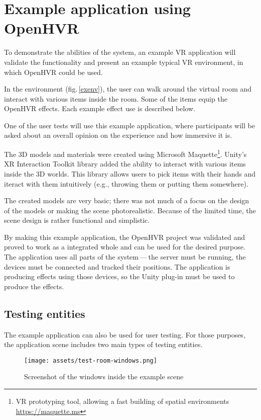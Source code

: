 \chapter{Example application using OpenHVR}\label{exampleapp}

To demonstrate the abilities of the system, an example VR application
will validate the functionality and present an example typical VR
environment, in which OpenHVR could be used.

In the environment (fig.\,\ref{exenv}), the user can walk around the virtual 
room and interact with various items inside the room. Some of the items equip the OpenHVR
effects. Each example effect use is described below.

One of the user tests will use this example application, where
participants will be asked about an overall opinion on the experience and
how immersive it is.

The 3D models and materials were created using Microsoft Maquette\footnote{VR 
prototyping tool, allowing a fast building of spatial 
environments \href{https://maquette.ms}{https://maquette.ms}}.
Unity’s XR Interaction Toolkit library added the ability to
interact with various items inside the 3D worlds. This library allows users to
pick items with their hands and iteract with them intuitively (e.g., throwing them
or putting them somewhere).


The created models are very basic; there was not much of a focus on the design
of the models or making the scene photorealistic. Because of the limited time,
the scene design is rather functional and simplistic.


By making this example application, the OpenHVR project was validated and proved
to work as a integrated whole and can be used for the desired purpose. The application uses
all parts of the system — the server must be running, the devices must be
connected and tracked their positions. The application is producing effects
using those devices, so the Unity plug-in must be used to produce the effects.

\hypertarget{x-testing-entities}{\section{Testing entities}}
The example application can also be used for user testing. For those purposes,
the application scene includes two main types of testing entities.

\newpage

\begin{figure}[h]{}
    \centering\texttt{[image: assets/test-room-windows.png]}
    \caption{Screenshot of the windows inside the example scene}
    \end{figure}

